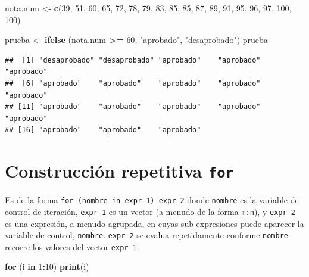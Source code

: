 \documentclass[]{book}
\newenvironment{Shaded}{\begin{snugshade}}{\end{snugshade}}
\newcommand{\KeywordTok}[1]{\textcolor[rgb]{0.13,0.29,0.53}{\textbf{#1}}}
\newcommand{\DecValTok}[1]{\textcolor[rgb]{0.00,0.00,0.81}{#1}}
\newcommand{\StringTok}[1]{\textcolor[rgb]{0.31,0.60,0.02}{#1}}
\newcommand{\ControlFlowTok}[1]{\textcolor[rgb]{0.13,0.29,0.53}{\textbf{#1}}}
\newcommand{\OperatorTok}[1]{\textcolor[rgb]{0.81,0.36,0.00}{\textbf{#1}}}
\newcommand{\NormalTok}[1]{#1}
\begin{document}
\begin{Shaded}
\begin{Highlighting}[]
\NormalTok{nota.num <-}\StringTok{ }\KeywordTok{c}\NormalTok{(}\DecValTok{39}\NormalTok{, }\DecValTok{51}\NormalTok{, }\DecValTok{60}\NormalTok{, }\DecValTok{65}\NormalTok{, }\DecValTok{72}\NormalTok{, }\DecValTok{78}\NormalTok{, }\DecValTok{79}\NormalTok{, }\DecValTok{83}\NormalTok{, }\DecValTok{85}\NormalTok{, }\DecValTok{85}\NormalTok{, }\DecValTok{87}\NormalTok{, }\DecValTok{89}\NormalTok{, }\DecValTok{91}\NormalTok{, }\DecValTok{95}\NormalTok{, }\DecValTok{96}\NormalTok{, }\DecValTok{97}\NormalTok{, }\DecValTok{100}\NormalTok{, }\DecValTok{100}\NormalTok{)}

\NormalTok{prueba <-}\StringTok{ }\KeywordTok{ifelse}\NormalTok{ (nota.num }\OperatorTok{>=}\StringTok{ }\DecValTok{60}\NormalTok{, }\StringTok{"aprobado"}\NormalTok{, }\StringTok{"desaprobado"}\NormalTok{)}
\NormalTok{prueba}
\end{Highlighting}
\end{Shaded}

\begin{verbatim}
##  [1] "desaprobado" "desaprobado" "aprobado"    "aprobado"    "aprobado"   
##  [6] "aprobado"    "aprobado"    "aprobado"    "aprobado"    "aprobado"   
## [11] "aprobado"    "aprobado"    "aprobado"    "aprobado"    "aprobado"   
## [16] "aprobado"    "aprobado"    "aprobado"
\end{verbatim}

\section{\texorpdfstring{Construcción repetitiva
\texttt{for}}{Construcción repetitiva for}}\label{construccion-repetitiva-for}

Es de la forma \texttt{for\ (nombre\ in\ expr\ 1)\ expr\ 2} donde
\texttt{nombre} es la variable de control de iteración, \texttt{expr\ 1}
es un vector (a menudo de la forma \texttt{m:n}), y \texttt{expr\ 2} es
una expresión, a menudo agrupada, en cuyas sub-expresiones puede
aparecer la variable de control, \texttt{nombre}. \texttt{expr\ 2} se
evalua repetidamente conforme \texttt{nombre} recorre los valores del
vector \texttt{expr\ 1}.

\begin{Shaded}
\begin{Highlighting}[]
\ControlFlowTok{for}\NormalTok{ (i }\ControlFlowTok{in} \DecValTok{1}\OperatorTok{:}\DecValTok{10}\NormalTok{) }\KeywordTok{print}\NormalTok{(i)}
\end{Highlighting}
\end{Shaded}
\end{document}

